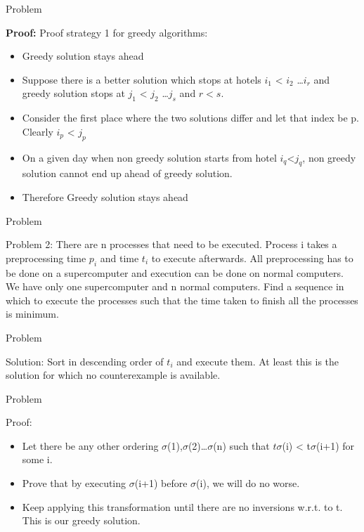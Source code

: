 \documentclass{beamer}
\begin{document}
\begin{frame}{Problem}
  \begin{block}
  {\bf Proof:}
  Proof strategy 1 for greedy algorithms:\\
  \begin{itemize}
  \item Greedy solution stays ahead
  \item Suppose there is a better solution which stops at hotels $i_1$ < $i_2$ \ldots $i_r$ and greedy solution stops at $j_1$ < $j_2$ \ldots $j_s$ and $r<s$.
  \item Consider the first place where the two solutions differ and let that index be p. Clearly $i_p$ < $j_p$
  \item On a given day when non greedy solution starts from hotel $i_q$<$j_q$, non greedy solution cannot end up ahead of greedy solution.
  \item Therefore Greedy solution stays ahead
  \end{itemize}
  \end{block}
\end{frame}

\begin{frame}{Problem}
  \begin{block}{Problem 2:}
  There are n processes that need to be executed. Process i takes a preprocessing time $p_i$ and time $t_i$ to execute afterwards. All preprocessing has to be done on a supercomputer and execution can be done on normal computers. We have only one supercomputer and n normal computers. Find a sequence in which to execute the processes such that the time taken to finish all the processes is minimum.
  \end{block}
\end{frame}

\begin{frame}{Problem}
  \begin{block}{Solution:}
  Sort in descending order of $t_i$ and execute them. At least this is the solution for which no counterexample is available.
  \end{block}
\end{frame}

\begin{frame}{Problem}
  \begin{block}{Proof:}
  \begin{itemize}
  \item Let there be any other ordering $\sigma$(1),$\sigma$(2)\ldots $\sigma$(n) such that $t\sigma$(i) < t$\sigma$(i+1) for some i.
  \item Prove that by executing $\sigma$(i+1) before $\sigma$(i), we will do no worse.
  \item Keep applying this transformation until there are no inversions w.r.t. to t. This is our greedy solution.
  \end{itemize}
  \end{block}
\end{frame}
\end{document}
